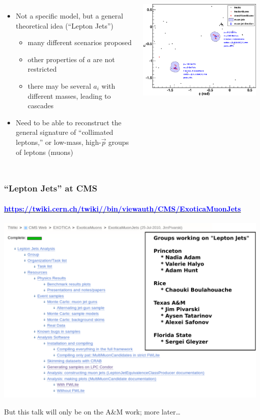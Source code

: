 \documentclass[compress]{beamer}
\begin{document}
\begin{frame}
\begin{columns}
\begin{itemize}
\item Not a specific model, but a general theoretical idea (``Lepton Jets'')
\begin{itemize}
\item many different scenarios proposed
\item other properties of $a$ are not restricted
\item there may be several $a_i$ with different masses, leading to cascades
\end{itemize}
\item Need to be able to reconstruct the general signature of ``collimated leptons,'' or low-mass, high-$\vec{p}$ groups of leptons (muons)
\end{itemize}

\vspace{-0.4 cm}
\begin{center}
\includegraphics[width=0.65\linewidth]{example_event_display_3.png}
\end{center}
\end{columns}
\end{frame}

\begin{frame}
\frametitle{``Lepton Jets'' at CMS}
\framesubtitle{\href{https://twiki.cern.ch/twiki//bin/viewauth/CMS/ExoticaMuonJets}{\textcolor{blue}{https://twiki.cern.ch/twiki//bin/viewauth/CMS/ExoticaMuonJets}}}

\includegraphics[width=\linewidth]{twiki.pdf}

But this talk will only be on the A\&M work; more later\ldots
\end{frame}
\end{document}
